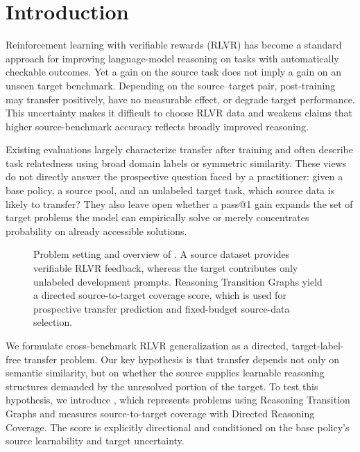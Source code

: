 \section{Introduction}
\label{sec:introduction}

Reinforcement learning with verifiable rewards (RLVR) has become a standard
approach for improving language-model reasoning on tasks with automatically
checkable outcomes.  Yet a gain on the source task does not imply a gain on an
unseen target benchmark.  Depending on the source--target pair, post-training
may transfer positively, have no measurable effect, or degrade target
performance.  This uncertainty makes it difficult to choose RLVR data and
weakens claims that higher source-benchmark accuracy reflects broadly improved
reasoning.

Existing evaluations largely characterize transfer after training and often
describe task relatedness using broad domain labels or symmetric similarity.
These views do not directly answer the prospective question faced by a
practitioner: given a base policy, a source pool, and an unlabeled target task,
which source data is likely to transfer?  They also leave open whether a pass@1
gain expands the set of target problems the model can empirically solve or
merely concentrates probability on already accessible solutions.

\begin{figure}[t]
    \centering
    \caption{Problem setting and overview of \method.  A source dataset
    provides verifiable RLVR feedback, whereas the target contributes only
    unlabeled development prompts.  Reasoning Transition Graphs yield a
    directed source-to-target coverage score, which is used for prospective
    transfer prediction and fixed-budget source-data selection.}
    \label{fig:overview}
\end{figure}

We formulate cross-benchmark RLVR generalization as a directed,
target-label-free transfer problem.  Our key hypothesis is that transfer
depends not only on semantic similarity, but on whether the source supplies
learnable reasoning structures demanded by the unresolved portion of the
target.  To test this hypothesis, we introduce \method, which represents
problems using Reasoning Transition Graphs and measures source-to-target
coverage with Directed Reasoning Coverage.  The score is explicitly
directional and conditioned on the base policy's source learnability and
target uncertainty.

